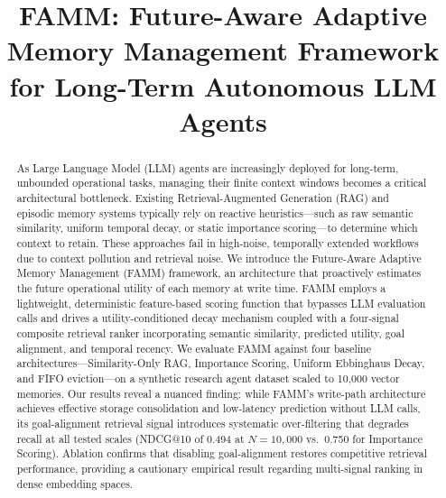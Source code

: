 \documentclass[conference]{IEEEtran}
\begin{document}
\title{FAMM: Future-Aware Adaptive Memory Management Framework for Long-Term Autonomous LLM Agents}

\author{
}

\maketitle

\begin{abstract}
As Large Language Model (LLM) agents are increasingly deployed for long-term, unbounded operational tasks, managing their finite context windows becomes a critical architectural bottleneck. Existing Retrieval-Augmented Generation (RAG) and episodic memory systems typically rely on reactive heuristics---such as raw semantic similarity, uniform temporal decay, or static importance scoring---to determine which context to retain. These approaches fail in high-noise, temporally extended workflows due to context pollution and retrieval noise. We introduce the Future-Aware Adaptive Memory Management (FAMM) framework, an architecture that proactively estimates the future operational utility of each memory at write time. FAMM employs a lightweight, deterministic feature-based scoring function that bypasses LLM evaluation calls and drives a utility-conditioned decay mechanism coupled with a four-signal composite retrieval ranker incorporating semantic similarity, predicted utility, goal alignment, and temporal recency. We evaluate FAMM against four baseline architectures---Similarity-Only RAG, Importance Scoring, Uniform Ebbinghaus Decay, and FIFO eviction---on a synthetic research agent dataset scaled to 10,000 vector memories. Our results reveal a nuanced finding: while FAMM's write-path architecture achieves effective storage consolidation and low-latency prediction without LLM calls, its goal-alignment retrieval signal introduces systematic over-filtering that degrades recall at all tested scales (NDCG@10 of 0.494 at $N{=}10{,}000$ vs.\ 0.750 for Importance Scoring). Ablation confirms that disabling goal-alignment restores competitive retrieval performance, providing a cautionary empirical result regarding multi-signal ranking in dense embedding spaces.
\end{abstract}
\end{document}
